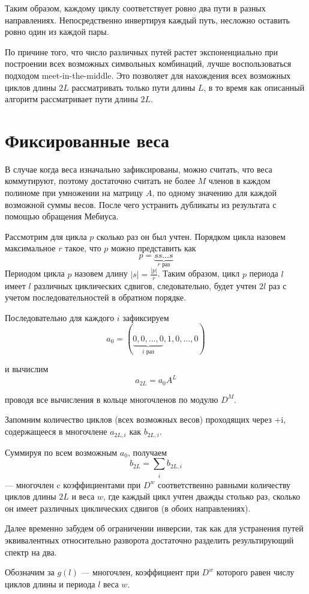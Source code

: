 Таким образом, каждому циклу соответствует ровно два пути в разных направлениях. Непосредственно
инвертируя каждый путь, несложно оставить ровно один из каждой пары.

По причине того, что число различных путей растет
экспоненциально при построении всех возможных символьных комбинаций, лучше воспользоваться подходом
meet-in-the-middle. Это позволяет для нахождения всех возможных циклов длины $2L$ рассматривать
только пути длины $L$, в то время как описанный алгоритм рассматривает пути длины $2L$.

\section{Фиксированные веса}
В случае когда веса изначально зафиксированы, можно считать, что веса коммутируют, поэтому достаточно
считать не более $M$ членов в каждом полиноме при умножении на матрицу $A$,
 по одному значению для каждой возможной суммы весов. После чего устранить дубликаты из результата с 
помощью обращения Мебиуса.

Рассмотрим для цикла $p$ сколько раз он был учтен. Порядком цикла назовем максимальное $r$ такое, что
$p$ можно представить как 
\[
p=\underbrace{ss \ldots s}_{r \text{ раз}}
\]
Периодом цикла $p$ назовем длину $|s|=\frac{|p|}{r}$. Таким образом, цикл $p$ 
периода $l$ имеет $l$ различных циклических сдвигов, следовательно, будет учтен $2l$ раз с учетом
последовательностей в обратном порядке.

Последовательно для каждого $i$ зафиксируем
\[
a_0=(\underbrace{0,0,...,0}_{i \text{ раз}},1,0,...,0)
\]

и вычислим
\[
a_{2L}=a_0A^L
\]

проводя все вычисления в кольце многочленов по модулю $D^M$.

Запомним количество циклов (всех возможных весов) проходящих через +i, содержащееся в 
многочлене $a_{2L,i}$ как $b_{2L,i}$.

Суммируя по всем возможным $a_0$, получаем 
\[
b_{2L}=\sum_{\substack{i}}b_{2L,i}
\]
 --- многочлен c коэффициентами при $D^w$ соответственно равными количеству циклов длины $2L$ и веса $w$,
 где каждый цикл учтен дважды столько раз, сколько он имеет различных циклических
 сдвигов (в обоих направлениях).  

Далее временно забудем об ограничении инверсии, так как для устранения путей эквивалентных
относительно разворота достаточно разделить результирующий спектр на два.

Обозначим за $g(l)$ --- многочлен, коэффициент при $D^w$ которого равен числу циклов длины и периода $l$ веса $w$.

